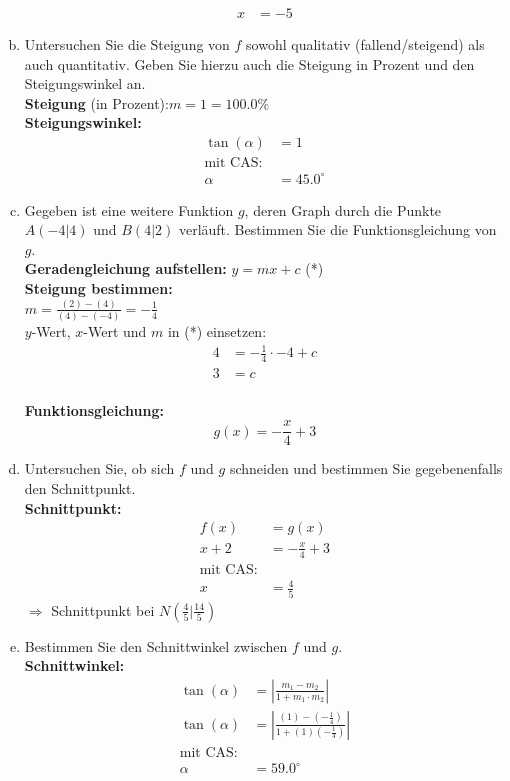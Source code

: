 \documentclass[12pt,fleqn]{article}
\theoremstyle{aufg}
\theoremstyle{bsp}
\begin{document}
\begin{flushleft}
\begin{enumerate}[a)]
\begin{align*}
x&=-5 
\end{align*} 
\clearpage
\item 
Untersuchen Sie die Steigung von $f$ sowohl qualitativ (fallend/steigend) als auch quantitativ. Geben Sie hierzu auch die Steigung in Prozent und den Steigungswinkel an. \\ 
{\bf Steigung} (in Prozent):\quad $m=1=100.0\%$ \\ 
{\bf Steigungswinkel:} \\ 
\begin{align*} 
\tan(\alpha) &=1\\ 
\text{mit CAS:} \\ 
\alpha &=45.0^{\circ} 
\end{align*} 

\item 
Gegeben ist eine weitere Funktion $g$, deren Graph durch die Punkte $A(-4|4)$ und $B(4|2)$ verl\"auft. Bestimmen Sie die Funktionsgleichung von $g$. \\ 
{\bf Geradengleichung aufstellen:} \quad $y=mx+c$ (*) \\ 
{\bf Steigung bestimmen:} \\ 
$m=\frac{(2)-(4)}{(4)-(-4)}=- \frac{1}{4}$ \\ 
$y$-Wert, $x$-Wert und $m$ in (*) einsetzen: 
\begin{align*} 
4&=- \frac{1}{4}\cdot-4+ c \\ 
3&= c 
\end{align*} \\ 
{\bf Funktionsgleichung:} 
\[g(x)=- \frac{x}{4} + 3\]
\item 
Untersuchen Sie, ob sich $f$ und $g$ schneiden und bestimmen Sie gegebenenfalls den Schnittpunkt. \\ 
{\bf Schnittpunkt:} 
\begin{align*} 
f(x)&=g(x) \\ 
x + 2&=- \frac{x}{4} + 3 \\ 
\text{mit CAS:} \\ 
x&=\frac{4}{5}\end{align*} 
$\Rightarrow$ Schnittpunkt bei $N(\frac{4}{5}|\frac{14}{5})$ \\ 

\item 
Bestimmen Sie den Schnittwinkel zwischen $f$ und $g$. \\ 
{\bf Schnittwinkel:} \\ 
\begin{align*} 
\tan(\alpha) &=\left|\frac{m_1-m_2}{1+m_1\cdot m_2}\right| \\ 
\tan(\alpha) &=\left|\frac{(1)-(- \frac{1}{4})}{1+(1)(- \frac{1}{4})}\right| \\ 
\text{mit CAS:} \\ 
\alpha &=59.0^{\circ} 
\end{align*} 

\end{enumerate} 
\end{flushleft} 
    
\end{document}
